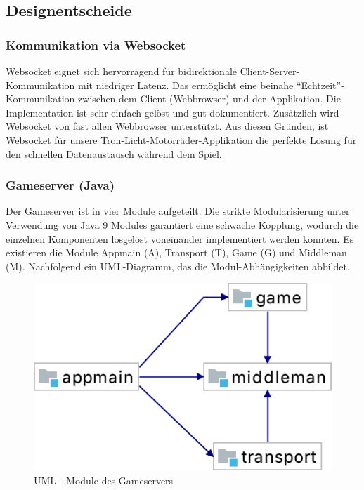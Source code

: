\documentclass[11pt,ngerman]{article}
\newcommand{\quotes}[1]{``#1''}
\begin{document}
    \subsection{Designentscheide}

    \subsubsection{Kommunikation via Websocket}
    \Gls{Websocket} eignet  sich hervorragend für bidirektionale Client-Server-Kommunikation mit niedriger Latenz. Das ermöglicht eine beinahe  \quotes{Echtzeit}-Kommunikation zwischen dem Client (\Gls{Webbrowser}) und der Applikation. Die Implementation ist sehr einfach gelöst und gut dokumentiert. Zusätzlich wird \Gls{Websocket} von fast allen \Gls{Webbrowser} unterstützt. Aus diesen Gründen, ist \Gls{Websocket} für unsere Tron-Licht-Motorräder-Applikation die perfekte Lösung für den schnellen Datenaustausch während dem Spiel.

    \subsubsection{Gameserver  (Java)}
	Der Gameserver ist in vier Module aufgeteilt. Die strikte Modularisierung unter Verwendung von Java 9 Modules garantiert eine schwache Kopplung, wodurch die einzelnen Komponenten losgelöst voneinander implementiert werden konnten. Es existieren die Module Appmain (A), Transport (T), Game (G) und Middleman (M). Nachfolgend ein UML-Diagramm, das die Modul-Abhängigkeiten abbildet.

	\begin{figure}[H]
    	\centering
    	\includegraphics[scale=0.5]{figures/gameserver-uml/modules.png}
    	\caption{UML - Module des Gameservers}
    	\label{fig:UMLModule}
    \end{figure}
\end{document}
